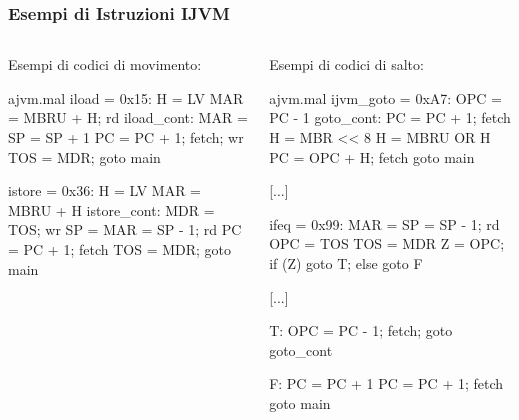 \documentclass{beamer}
\begin{document}
\begin{frame}[fragile]
  \frametitle{Esempi di Istruzioni IJVM}
  \begin{columns}
    \begin{column}{0.5\textwidth}
      Esempi di codici di movimento:
\begin{myvhdl}{ajvm.mal}
iload = 0x15:
        H = LV
        MAR = MBRU + H; rd
iload_cont:
        MAR = SP = SP + 1
        PC = PC + 1; fetch; wr
        TOS = MDR; goto main

istore = 0x36:
        H = LV
        MAR = MBRU + H
istore_cont:
        MDR = TOS; wr
        SP = MAR = SP - 1; rd
        PC = PC + 1; fetch
        TOS = MDR; goto main
\end{myvhdl}
\end{column}
\begin{column}{0.5\textwidth}
  Esempi di codici di salto:
\begin{myvhdl}{ajvm.mal}
ijvm_goto = 0xA7:
        OPC = PC - 1
goto_cont:
        PC = PC + 1; fetch
        H = MBR << 8
        H = MBRU OR H
        PC = OPC + H; fetch
        goto main

[...]

ifeq = 0x99:
        MAR = SP = SP - 1; rd
        OPC = TOS
        TOS = MDR
        Z = OPC; if (Z) goto T; else goto F

[...]

T:
        OPC = PC - 1; fetch; goto goto_cont

F:
        PC = PC + 1
        PC = PC + 1; fetch
        goto main
\end{myvhdl}
    \end{column}
    \end{columns}
\end{frame}
\end{document}
